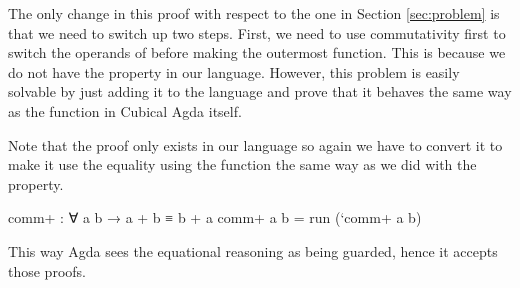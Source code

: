 The only change in this proof with respect to the one in Section \ref{sec:problem} is that
we need to switch up two steps. First, we need to use commutativity first to switch the
operands of \AgdaFunction{\_+\_} before making  the outermost function.
This is because we do not have the  property in our language.
However, this problem is easily solvable by just adding it to the language and
prove that it behaves the same way as the  function in Cubical Agda itself.

Note that the proof only exists in our language so again we have to convert
it to make it use the equality using the  function the same
way as we did with the  property.

\begin{code}
comm+ : ∀ a b → a + b ≡ b + a
comm+ a b = run (`comm+ a b)
\end{code}

This way Agda sees the equational reasoning as being guarded, hence it accepts those proofs.
